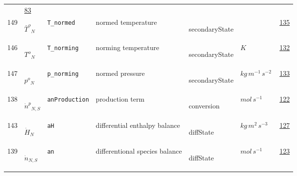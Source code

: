 \begin{longtable}{|p{1cm}|p{2.5cm}|p{4.5cm}|p{8cm}|p{3.0cm}|p{3cm}|p{1cm}|}
             &                 \hyperlink{"e:83"}{ 83 }
                 \\
            149
             & \hypertarget{"v:149"}{ $ {{\bar{T}^o}}{_{N}} $}
             & \verb|T_normed|
             & normed temperature
             & \begin{lay}secondaryState \end{lay}
             & $  $
             &                 \hyperlink{"e:135"}{ 135 }
                 \\
            146
             & \hypertarget{"v:146"}{ $ {{T^o}}{_{N}} $}
             & \verb|T_norming|
             & norming temperature
             & \begin{lay}secondaryState \end{lay}
             & $ K \, $
             &                 \hyperlink{"e:132"}{ 132 }
                 \\
            147
             & \hypertarget{"v:147"}{ $ {{p^o}}{_{N}} $}
             & \verb|p_norming|
             & normed pressure
             & \begin{lay}secondaryState \end{lay}
             & $ kg \,m^{-1} \,s^{-2} \, $
             &                 \hyperlink{"e:133"}{ 133 }
                 \\
            138
             & \hypertarget{"v:138"}{ $ {{\dot{n}^p}}{_{N, S}} $}
             & \verb|anProduction|
             & production term
             & \begin{lay}conversion \end{lay}
             & $ mol \,s^{-1} \, $
             &                 \hyperlink{"e:122"}{ 122 }
                 \\
            143
             & \hypertarget{"v:143"}{ $ {{\dot{H}}}{_{N}} $}
             & \verb|aH|
             & differential enthalpy balance
             & \begin{lay}diffState \end{lay}
             & $ kg \,m^{2} \,s^{-3} \, $
             &                 \hyperlink{"e:127"}{ 127 }
                 \\
            139
             & \hypertarget{"v:139"}{ $ {{\dot{n}}}{_{N, S}} $}
             & \verb|an|
             & differentional species balance
             & \begin{lay}diffState \end{lay}
             & $ mol \,s^{-1} \, $
             &                 \hyperlink{"e:123"}{ 123 }
                 \\
    \end{longtable}